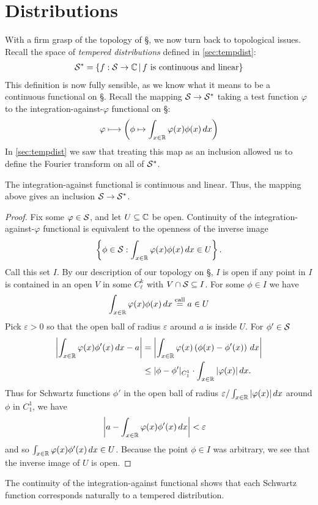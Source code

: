 
  \chapter{Distributions}
  \label{ch:dist}
  
  With a firm grasp of the topology of \S, we now turn back to topological issues.
  Recall the space of \emph{tempered distributions} defined in \autoref{sec:tempdist}:
  \begin{align*}
    \S^* = \{f:\S\rightarrow\C\,\vert\,f\text{ is continuous and linear}\}
  \end{align*}
  This definition is now fully sensible, as we know what it means to be a continuous functional on \S.
  Recall the mapping $\S\rightarrow\S^*$ taking a test function $\varphi$ to the integration-against-$\varphi$ functional on \S:
  \begin{align*}
    \varphi \longmapsto \left( \phi \mapsto \int_{x\in\R} \varphi(x) \phi(x)\,dx \right)
  \end{align*}
  In \autoref{sec:tempdist} we saw that treating this map as an inclusion allowed us to define the Fourier transform on all of $\S^*$.
  \begin{claim}
    The integration-against functional is continuous and linear.
    Thus, the mapping above gives an inclusion $\S\rightarrow\S^*$.
    \begin{proof}
      Fix some $\varphi\in\S$, and let $U\subseteq\C$ be open.
      Continuity of the integration-against-$\varphi$ functional is equivalent to the openness of the inverse image
      \begin{align*}
        \left\{\phi\in\S:\int_{x\in\R}\varphi(x)\phi(x)\,dx\in U \right\}\text{.}
      \end{align*}
      Call this set $I$.
      By our description of our topology on \S, $I$ is open if any point in $I$ is contained in an open $V$ in some $C^k_\ell$ with $V\cap\S\subseteq I$.
      For some $\phi\in I$ we have
      \begin{align*}
        \int_{x\in\R} \varphi(x)\phi(x) \,dx \overset{\text{call}}{=} a \in U
      \end{align*}
      Pick $\varepsilon>0$ so that the open ball of radius $\varepsilon$ around $a$ is inside $U$. 
      For $\phi'\in\S$
      \begin{align*}
        \left|\int_{x\in\R}\varphi(x)\phi'(x)\,dx - a\right|
        &= \left|\int_{x\in\R}\varphi(x)\left(\phi(x)-\phi'(x)\right)\,dx\right|
        \\&\le |\phi-\phi'|_{C^1_1}\cdot\int_{x\in\R} |\varphi(x)|\,dx\text{.}
      \end{align*}
      Thus for Schwartz functions $\phi'$ in the open ball of radius $\varepsilon/\int_{x\in\R}|\varphi(x)|\,dx$ around $\phi$ in $C^1_1$, we have
      \begin{align*}
        \left|a-\int_{x\in\R}\varphi(x)\phi'(x)\,dx\right|
        &< \varepsilon
      \end{align*}
      and so $\int_{x\in\R}\varphi(x)\phi'(x)\,dx\in U$.
      Because the point $\phi\in I$ was arbitrary, we see that the inverse image of $U$ is open.
    \end{proof}
  \end{claim}

  The continuity of the integration-against functional shows that each Schwartz function corresponds naturally to a tempered distribution.



